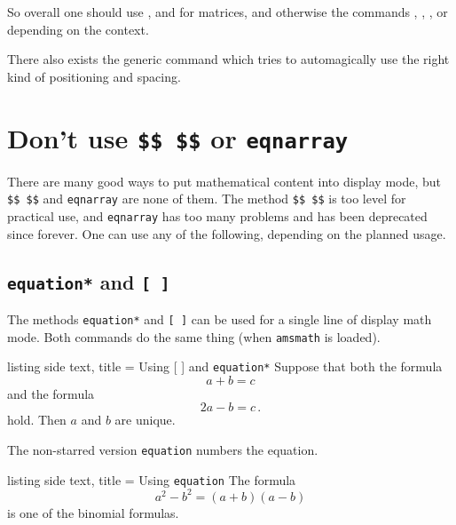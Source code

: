 \documentclass[a4paper, 10pt, headings=standardclasses, oneside, bibliography=totocnumbered]{scrbook}
\begin{document}
So overall one should use ,  and  for matrices, and otherwise the commands , , ,  or  depending on the context.

There also exists the generic command  which tries to automagically use the right kind of positioning and spacing.





\section{Don’t use \texttt{\$\$  \$\$} or \texttt{eqnarray}}

There are many good ways to put mathematical content into display mode, but \texttt{\$\$  \$\$} and \texttt{eqnarray} are none of them.
The method \texttt{\$\$  \$\$} is too level for practical use, and \texttt{eqnarray} has too many problems and has been deprecated since forever.
One can use any of the following, depending on the planned usage.



\subsection{\texttt{equation*} and \texttt{{\tbs}[ {\tbs}]}}
The methods \texttt{equation*} and \texttt{{\tbs}[ {\tbs}]} can be used for a single line of display math mode.
Both commands do the same thing (when \texttt{amsmath} is loaded).
\begin{tcblisting}{listing side text, title = {Using {\tbs}[ {\tbs}] and \texttt{equation*}}}
Suppose that both the formula
\[
  a + b = c
\]
and the formula
\begin{equation*}
  2a - b = c \,.
\end{equation*}
hold.
Then $a$ and $b$ are unique.
\end{tcblisting}
The non-starred version \texttt{equation} numbers the equation.
\begin{tcblisting}{listing side text, title = {Using \texttt{equation}}}
The formula
\begin{equation}
  a^2 - b^2 = (a + b)(a - b)
\end{equation}
is one of the binomial formulas.
\end{tcblisting}
\end{document}
